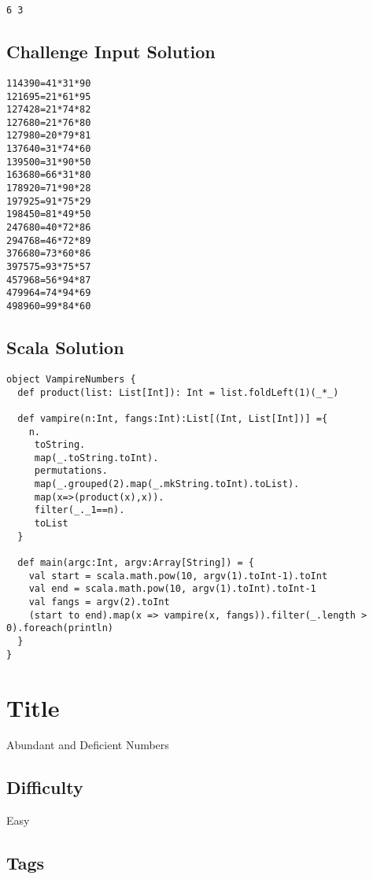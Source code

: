 \begin{verbatim}
6 3
\end{verbatim}

\subsection{Challenge Input Solution}\label{challenge-input-solution-1}

\begin{verbatim}
114390=41*31*90
121695=21*61*95
127428=21*74*82
127680=21*76*80
127980=20*79*81
137640=31*74*60
139500=31*90*50
163680=66*31*80
178920=71*90*28
197925=91*75*29
198450=81*49*50
247680=40*72*86
294768=46*72*89
376680=73*60*86
397575=93*75*57
457968=56*94*87
479964=74*94*69
498960=99*84*60
\end{verbatim}

\subsection{Scala Solution}\label{scala-solution-9}

\begin{verbatim}
object VampireNumbers {
  def product(list: List[Int]): Int = list.foldLeft(1)(_*_)

  def vampire(n:Int, fangs:Int):List[(Int, List[Int])] ={
    n.
     toString.
     map(_.toString.toInt).
     permutations.
     map(_.grouped(2).map(_.mkString.toInt).toList).
     map(x=>(product(x),x)).
     filter(_._1==n).
     toList
  }

  def main(argc:Int, argv:Array[String]) = {
    val start = scala.math.pow(10, argv(1).toInt-1).toInt
    val end = scala.math.pow(10, argv(1).toInt).toInt-1
    val fangs = argv(2).toInt
    (start to end).map(x => vampire(x, fangs)).filter(_.length > 0).foreach(println)
  }
}
\end{verbatim}

\section{Title}\label{title-12}

Abundant and Deficient Numbers

\subsection{Difficulty}\label{difficulty-11}

Easy

\subsection{Tags}\label{tags-12}

